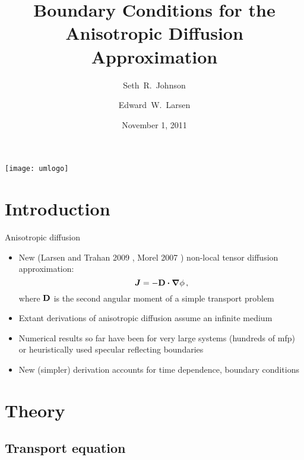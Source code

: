 \documentclass{beamer}
\title[AD BCs]%
{Boundary Conditions for the Anisotropic Diffusion Approximation}
\author[SRJ, EWL]{Seth~R.~Johnson \and Edward~W.~Larsen}
\institute[UMich]{
University of Michigan, Ann Arbor
}
\date[11/1/2011]{November 1, 2011}
\begin{document}

\begin{frame}
\titlepage
\begin{center}
  \texttt{[image: umlogo]}
\end{center}
\end{frame}

\section{Introduction}
\begin{frame}{Anisotropic diffusion}
  \begin{itemize}
    \item New (Larsen and Trahan 2009 \cite{Lar2009c}, Morel 2007
      \cite{Mor2007}) non-local tensor diffusion approximation:
      \begin{equation*}
        \bm{J} = - \mathbf{D} \bm{\cdot} \bm{\nabla} \phi \,,
      \end{equation*}
      where $\mathbf{D}$ is the second angular moment of a simple transport problem
    \item Extant derivations of anisotropic diffusion assume an infinite medium
    \item Numerical results so far have been for very large systems (hundreds of
      mfp) \cite{Lar2009c,Joh2011} or heuristically used specular reflecting
      boundaries \cite{Tra2011}
    \item New (simpler) derivation accounts for time dependence,
      boundary conditions
  \end{itemize}
\end{frame}

\section{Theory}

\subsection{Transport equation}
\end{document}
